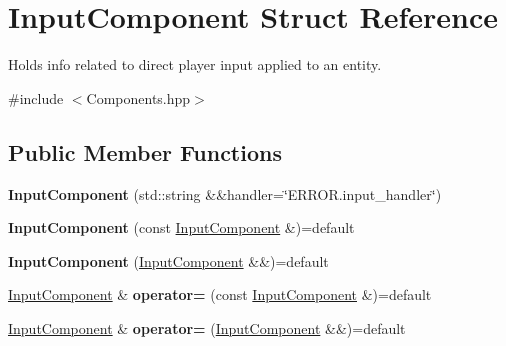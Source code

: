 \hypertarget{struct_input_component}{}\section{Input\+Component Struct Reference}
\label{struct_input_component}


Holds info related to direct player input applied to an entity.  




{\ttfamily \#include $<$Components.\+hpp$>$}

\subsection*{Public Member Functions}
\begin{DoxyCompactItemize}
\item 
{\bfseries Input\+Component} (std\+::string \&\&handler=\char`\"{}E\+R\+R\+O\+R.\+input\+\_\+handler\char`\"{})\hypertarget{struct_input_component_ab2803ef8ff9e09f87c8426beec0c0223}{}\label{struct_input_component_ab2803ef8ff9e09f87c8426beec0c0223}

\item 
{\bfseries Input\+Component} (const \hyperlink{struct_input_component}{Input\+Component} \&)=default\hypertarget{struct_input_component_ab35d58b204fea0461f1a2df787e250f2}{}\label{struct_input_component_ab35d58b204fea0461f1a2df787e250f2}

\item 
{\bfseries Input\+Component} (\hyperlink{struct_input_component}{Input\+Component} \&\&)=default\hypertarget{struct_input_component_a27c7f78af492719184e7ad3f44df99f5}{}\label{struct_input_component_a27c7f78af492719184e7ad3f44df99f5}

\item 
\hyperlink{struct_input_component}{Input\+Component} \& {\bfseries operator=} (const \hyperlink{struct_input_component}{Input\+Component} \&)=default\hypertarget{struct_input_component_a92d7d6443d4245633235225144bcffd1}{}\label{struct_input_component_a92d7d6443d4245633235225144bcffd1}

\item 
\hyperlink{struct_input_component}{Input\+Component} \& {\bfseries operator=} (\hyperlink{struct_input_component}{Input\+Component} \&\&)=default\hypertarget{struct_input_component_a29efb3bb4e166bf7453dd8519651083c}{}\label{struct_input_component_a29efb3bb4e166bf7453dd8519651083c}

\end{DoxyCompactItemize}
